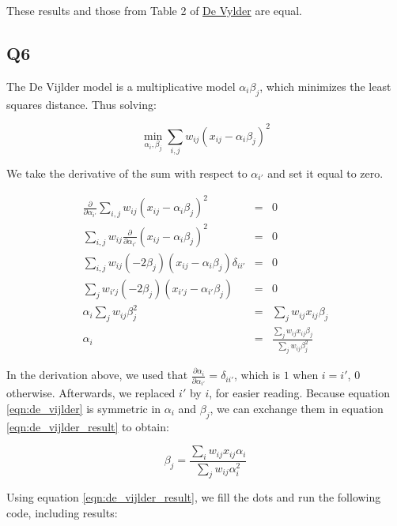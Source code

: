 \documentclass[11pt]{article}
\begin{document}
These results and those from Table 2 of \href{http://www1.fee.uva.nl/ke/act/people/kaas/DeVylder78.pdf}{De Vylder} are equal.

\subsection*{Q6}\label{ssec:q6}

The De Vijlder model is a multiplicative model $\alpha_{i}\beta_{j}$, which minimizes the least squares distance. Thus solving:

\begin{equation}\label{eqn:de_vijlder}
\min_{\alpha_{i},\beta_{j}} \sum_{i,j}w_{ij}\left(x_{ij} - \alpha_{i}\beta_{j}\right)^{2}
\end{equation}

We take the derivative of the sum with respect to $\alpha_{i'}$ and set it equal to zero.

\begin{eqnarray}
\frac{\partial}{\partial \alpha_{i'}} \sum_{i,j}w_{ij}\left(x_{ij} - \alpha_{i}\beta_{j}\right)^{2} &=& 0 \\
\sum_{i,j}w_{ij}\frac{\partial}{\partial \alpha_{i'}}\left(x_{ij} - \alpha_{i}\beta_{j}\right)^{2} &=& 0 \\
\sum_{i,j} w_{ij} \left(-2\beta_{j}\right) \left(x_{ij} - \alpha_{i}\beta_{j}\right) \delta_{i i'} &=& 0 \\
\sum_{j} w_{i'j} \left(-2\beta_{j}\right) \left(x_{i'j} - \alpha_{i'}\beta_{j}\right) &=& 0 \\
\alpha_{i} \sum_{j} w_{ij} \beta_{j}^{2} &=& \sum_{j} w_{ij}  x_{ij} \beta_{j}\\
\alpha_{i} &=& \frac{\sum_{j} w_{ij} x_{ij} \beta_{j}}{\sum_{j} w_{ij} \beta_{j}^{2}} \label{eqn:de_vijlder_result}
\end{eqnarray}

In the derivation above, we used that $ \frac{\partial \alpha_{i}}{\partial \alpha_{i'}} = \delta_{i i'} $, which is $1$ when $i = i'$, $0$ otherwise. Afterwards, we replaced $i'$ by $i$, for easier reading. Because equation \ref{eqn:de_vijlder} is symmetric in $\alpha_{i}$ and $\beta_{j}$, we can exchange them in equation \ref{eqn:de_vijlder_result} to obtain:

\begin{equation}
\beta_{j} = \frac{\sum_{i} w_{ij} x_{ij} \alpha_{i}}{\sum_{j} w_{ij} \alpha_{i}^{2}} 
\end{equation}

Using equation \ref{eqn:de_vijlder_result}, we fill the dots and run the following code, including results:
\end{document}
